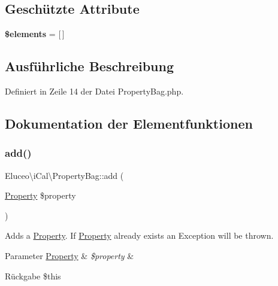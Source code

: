 \subsection*{Geschützte Attribute}
\begin{DoxyCompactItemize}
\item 
\mbox{\label{class_eluceo_1_1i_cal_1_1_property_bag_aa6975d2fb01d42a13b33b3080957524e}} 
{\bfseries \$elements} = \mbox{[}$\,$\mbox{]}
\end{DoxyCompactItemize}


\subsection{Ausführliche Beschreibung}


Definiert in Zeile 14 der Datei Property\+Bag.\+php.



\subsection{Dokumentation der Elementfunktionen}
\mbox{\label{class_eluceo_1_1i_cal_1_1_property_bag_a285b4d352bd4b646096b00189461272d}} 
\subsubsection{\texorpdfstring{add()}{add()}\hspace{0.1cm}{\footnotesize\ttfamily [1/3]}}
{\footnotesize\ttfamily Eluceo\textbackslash{}i\+Cal\textbackslash{}\+Property\+Bag\+::add (\begin{DoxyParamCaption}\item[{\mbox{\hyperlink{class_eluceo_1_1i_cal_1_1_property}{Property}}}]{\$property }\end{DoxyParamCaption})}

Adds a \mbox{\hyperlink{class_eluceo_1_1i_cal_1_1_property}{Property}}. If \mbox{\hyperlink{class_eluceo_1_1i_cal_1_1_property}{Property}} already exists an Exception will be thrown.


\begin{DoxyParams}[1]{Parameter}
\mbox{\hyperlink{class_eluceo_1_1i_cal_1_1_property}{Property}} & {\em \$property} & \\
\hline
\end{DoxyParams}
\begin{DoxyReturn}{Rückgabe}
\$this
\end{DoxyReturn}

